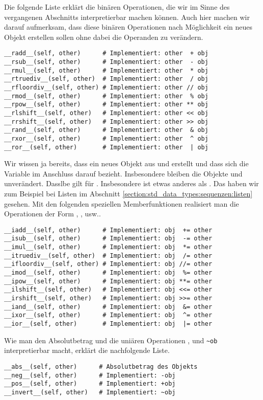 Die folgende Liste erklärt die binären Operationen, die wir im Sinne des vergangenen Abschnitts interpretierbar machen können.
Auch hier machen wir darauf aufmerksam, dass diese binären Operationen nach Möglichkeit ein neues Objekt erstellen sollen ohne dabei die Operanden zu verändern.
\begin{lstlisting}
__radd__(self, other)      # Implementiert: other  + obj
__rsub__(self, other)      # Implementiert: other  - obj
__rmul__(self, other)      # Implementiert: other  * obj
__rtruediv__(self, other)  # Implementiert: other  / obj
__rfloordiv__(self, other) # Implementiert: other // obj
__rmod__(self, other)      # Implementiert: other  % obj
__rpow__(self, other)      # Implementiert: other ** obj
__rlshift__(self, other)   # Implementiert: other << obj
__rrshift__(self, other)   # Implementiert: other >> obj
__rand__(self, other)      # Implementiert: other  & obj
__rxor__(self, other)      # Implementiert: other  ^ obj
__ror__(self, other)       # Implementiert: other  | obj
\end{lstlisting}

Wir wissen ja bereits, dass  ein neues Objekt aus  und  erstellt und dass sich die Variable  im Anschluss darauf bezieht.
Insbesondere bleiben die Objekte  und  unverändert.
Dasslbe gilt für .
Insbesondere ist  etwas anderes als .
Das haben wir zum Beispiel bei Listen im Abschnitt \ref{section:std_data_types:sequenzen:listen} gesehen.
Mit den folgenden speziellen Memberfunktionen realisiert man die Operationen der Form , , usw..
\begin{lstlisting}
__iadd__(self, other)      # Implementiert: obj  += other
__isub__(self, other)      # Implementiert: obj  -= other
__imul__(self, other)      # Implementiert: obj  *= other
__itruediv__(self, other)  # Implementiert: obj  /= other
__ifloordiv__(self, other) # Implementiert: obj //= other
__imod__(self, other)      # Implementiert: obj  %= other
__ipow__(self, other)      # Implementiert: obj **= other
__ilshift__(self, other)   # Implementiert: obj <<= other
__irshift__(self, other)   # Implementiert: obj >>= other
__iand__(self, other)      # Implementiert: obj  &= other
__ixor__(self, other)      # Implementiert: obj  ^= other
__ior__(self, other)       # Implementiert: obj  |= other
\end{lstlisting}

Wie man den Absolutbetrag und die uniären Operationen ,  und \lstinline[style=Pyinline]|~ob| interpretierbar macht,
erklärt die nachfolgende Liste.
\begin{lstlisting}
__abs__(self, other)      # Absolutbetrag des Objekts
__neg__(self, other)      # Implementiert: -obj
__pos__(self, other)      # Implementiert: +obj
__invert__(self, other)   # Implementiert: ~obj
\end{lstlisting}
